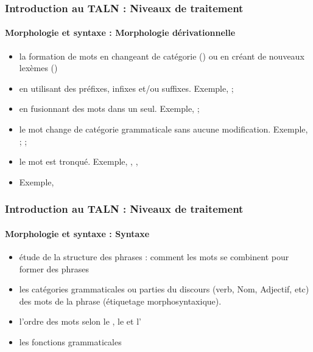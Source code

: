 \documentclass[xcolor=table]{beamer}
\begin{document}
\begin{frame}
\frametitle{Introduction au TALN : Niveaux de traitement}
\framesubtitle{Morphologie et syntaxe : Morphologie dérivationnelle}

\begin{itemize}
	\item la formation de mots en changeant de catégorie () ou en créant de nouveaux lexèmes ()
	
	\item {} en utilisant des préfixes, infixes et/ou suffixes. 
	Exemple, ; 
	\item {} en fusionnant des mots  dans un seul. 
	Exemple, ; 
	
	\item {} le mot change de catégorie grammaticale sans aucune modification. 
	Exemple, ; ; 
	
	\item {} le mot est tronqué. 
	Exemple, , , 
	
	\item {} Exemple,  
	
\end{itemize}

\end{frame}

\begin{frame}
\frametitle{Introduction au TALN : Niveaux de traitement}
\framesubtitle{Morphologie et syntaxe : Syntaxe}

\begin{itemize}
	\item étude de la structure des phrases : comment les mots se combinent pour former des phrases
	\item les catégories grammaticales ou parties du discours (verb, Nom, Adjectif, etc) des mots de la phrase (étiquetage morphosyntaxique).
	\item l'ordre des mots selon le , le  et l'
	\item les fonctions grammaticales
\end{itemize}

\end{frame}
\end{document}
